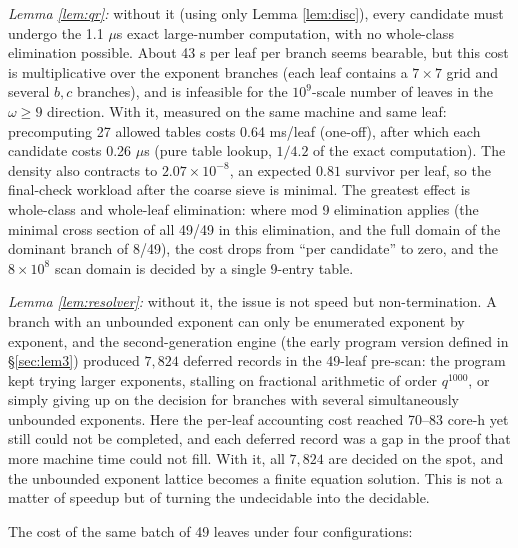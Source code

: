 \documentclass[11pt]{article}
\theoremstyle{remark}
\begin{document}
\emph{Lemma \ref{lem:qr}:} without it (using only Lemma \ref{lem:disc}), every candidate must undergo the 1.1 $\mu$s exact large-number computation, with no whole-class elimination possible. About 43 s per leaf per branch seems bearable, but this cost is multiplicative over the exponent branches (each leaf contains a $7 \times 7$ grid and several $b, c$ branches), and is infeasible for the $10^9$-scale number of leaves in the $\omega \ge 9$ direction. With it, measured on the same machine and same leaf: precomputing 27 allowed tables costs 0.64 ms/leaf (one-off), after which each candidate costs 0.26 $\mu$s (pure table lookup, $1/4.2$ of the exact computation). The density also contracts to $2.07 \times 10^{-8}$, an expected $0.81$ survivor per leaf, so the final-check workload after the coarse sieve is minimal. The greatest effect is whole-class and whole-leaf elimination: where mod 9 elimination applies (the minimal cross section of all 49/49 in this elimination, and the full domain of the dominant branch of 8/49), the cost drops from ``per candidate'' to zero, and the $8 \times 10^8$ scan domain is decided by a single 9-entry table.

\emph{Lemma \ref{lem:resolver}:} without it, the issue is not speed but non-termination. A branch with an unbounded exponent can only be enumerated exponent by exponent, and the second-generation engine (the early program version defined in \S\ref{sec:lem3}) produced $7{,}824$ deferred records in the 49-leaf pre-scan: the program kept trying larger exponents, stalling on fractional arithmetic of order $q^{1000}$, or simply giving up on the decision for branches with several simultaneously unbounded exponents. Here the per-leaf accounting cost reached 70--83 core-h yet still could not be completed, and each deferred record was a gap in the proof that more machine time could not fill. With it, all $7{,}824$ are decided on the spot, and the unbounded exponent lattice becomes a finite equation solution. This is not a matter of speedup but of turning the undecidable into the decidable.

The cost of the same batch of 49 leaves under four configurations:
\end{document}
